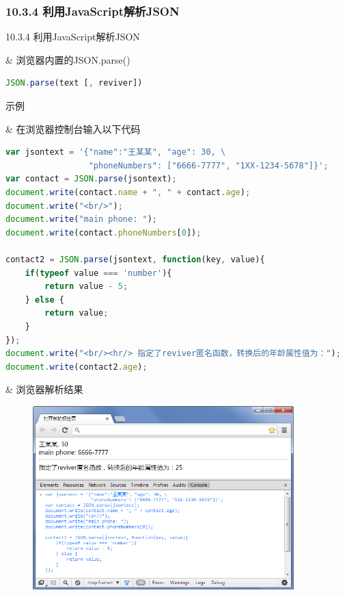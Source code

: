 \subsubsection{10.3.4 利用JavaScript解析JSON}
\begin{frame}[fragile]{10.3.4 利用JavaScript解析JSON}
\begin{easylist} \easyitem
& 浏览器内置的JSON.parse()
\begin{lstlisting}[tabsize=8, basicstyle=\small\tt, language=JavaScript, numbers=none]
JSON.parse(text [, reviver])
\end{lstlisting}
\end{easylist}
\end{frame}


\begin{frame}{示例}
\begin{easylist} \easyitem
& 在浏览器控制台输入以下代码
\begin{lstlisting}[tabsize=8, basicstyle=\small\tt, language=JavaScript, numbers=none]
var jsontext = '{"name":"王某某", "age": 30, \
                 "phoneNumbers": ["6666-7777", "1XX-1234-5678"]}';
var contact = JSON.parse(jsontext); 
document.write(contact.name + ", " + contact.age); 
document.write("<br/>");
document.write("main phone: ");
document.write(contact.phoneNumbers[0]); 

contact2 = JSON.parse(jsontext, function(key, value){ 
    if(typeof value === 'number'){ 
        return value - 5; 
    } else {
        return value; 
    }
}); 
document.write("<br/><hr/> 指定了reviver匿名函数，转换后的年龄属性值为：");
document.write(contact2.age);
\end{lstlisting}
& 浏览器解析结果
\begin{figure}
    \includegraphics[width=0.9\textwidth]{figure/app-json.png}
\end{figure}
\end{easylist}
\end{frame}


